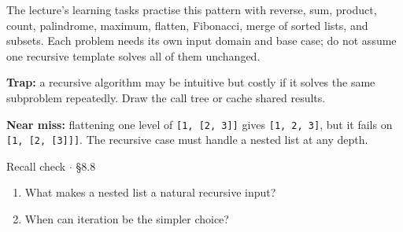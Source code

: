 \documentclass[11pt]{article}
\begin{document}
\begin{keepsection}
The lecture’s learning tasks practise this pattern with reverse, sum, product, count, palindrome, maximum, flatten, Fibonacci, merge of sorted lists, and subsets. Each problem needs its own input domain and base case; do not assume one recursive template solves all of them unchanged.

\begin{notebox}\textbf{Trap:} a recursive algorithm may be intuitive but costly if it solves the same subproblem repeatedly. Draw the call tree or cache shared results.\end{notebox}

\begin{notebox}\textbf{Near miss:} flattening one level of \texttt{[1, [2, 3]]} gives \texttt{[1, 2, 3]}, but it fails on \texttt{[1, [2, [3]]]}. The recursive case must handle a nested list at any depth.\end{notebox}

\begin{recallbox}{Recall check \ensuremath{\cdot} §8.8}
\begin{enumerate}
\item What makes a nested list a natural recursive input?
\item When can iteration be the simpler choice?
\end{enumerate}

\end{recallbox}
\end{keepsection}
\end{document}

